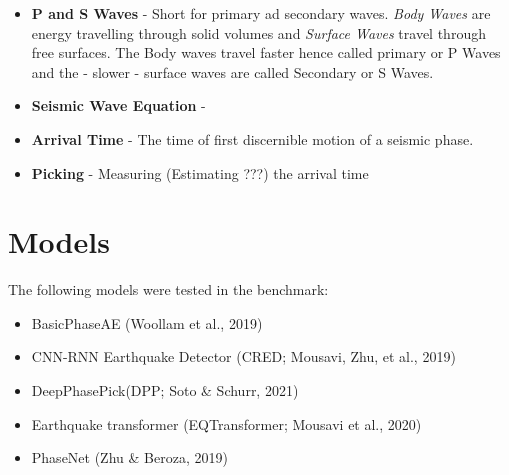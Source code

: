 \documentclass[11pt,a4paper]{article}
\begin{document}
\begin{itemize}
\item \textbf{P and S Waves} - Short for primary ad secondary waves. \textit{Body Waves} are energy travelling through solid volumes and \textit{Surface Waves} travel through free surfaces. The Body waves travel faster hence called primary or P Waves and the - slower - surface waves  are called Secondary or S Waves.

\item \textbf{Seismic Wave Equation} - 

%

\item \textbf{Arrival Time} - The time of first discernible motion of a seismic phase.

\item \textbf{Picking} - Measuring (Estimating ???) the arrival time


\end{itemize}


\section{Models}
The following models were tested in the benchmark:
\begin{itemize}
\item BasicPhaseAE (Woollam et al., 2019)
\item CNN-RNN Earthquake Detector (CRED; Mousavi, Zhu, et al., 2019)
\item DeepPhasePick(DPP; Soto \& Schurr, 2021)
\item Earthquake transformer (EQTransformer; Mousavi et al., 2020)
\item PhaseNet (Zhu \& Beroza, 2019)
\end{itemize}
\end{document}
